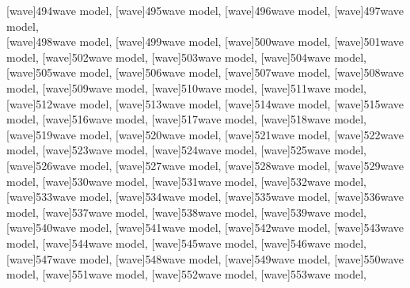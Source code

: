 \documentclass[a4paper,11pt]{article}
\begin{document}
[wave]{494}{wave model},
[wave]{495}{wave model},
[wave]{496}{wave model},
[wave]{497}{wave model}, \\[0.7em]
[wave]{498}{wave model},
[wave]{499}{wave model},
[wave]{500}{wave model},
[wave]{501}{wave model},
[wave]{502}{wave model},
[wave]{503}{wave model},
[wave]{504}{wave model}, \\[0.7em]
[wave]{505}{wave model},
[wave]{506}{wave model},
[wave]{507}{wave model},
[wave]{508}{wave model},
[wave]{509}{wave model},
[wave]{510}{wave model},
[wave]{511}{wave model}, \\[0.7em]
[wave]{512}{wave model},
[wave]{513}{wave model},
[wave]{514}{wave model},
[wave]{515}{wave model},
[wave]{516}{wave model},
[wave]{517}{wave model},
[wave]{518}{wave model}, \\[0.7em]
[wave]{519}{wave model},
[wave]{520}{wave model},
[wave]{521}{wave model},
[wave]{522}{wave model},
[wave]{523}{wave model},
[wave]{524}{wave model},
[wave]{525}{wave model}, \\[0.7em]
[wave]{526}{wave model},
[wave]{527}{wave model},
[wave]{528}{wave model},
[wave]{529}{wave model},
[wave]{530}{wave model},
[wave]{531}{wave model},
[wave]{532}{wave model}, \\[0.7em]
[wave]{533}{wave model},
[wave]{534}{wave model},
[wave]{535}{wave model},
[wave]{536}{wave model},
[wave]{537}{wave model},
[wave]{538}{wave model},
[wave]{539}{wave model}, \\[0.7em]
[wave]{540}{wave model},
[wave]{541}{wave model},
[wave]{542}{wave model},
[wave]{543}{wave model},
[wave]{544}{wave model},
[wave]{545}{wave model},
[wave]{546}{wave model}, \\[0.7em]
[wave]{547}{wave model},
[wave]{548}{wave model},
[wave]{549}{wave model},
[wave]{550}{wave model},
[wave]{551}{wave model},
[wave]{552}{wave model},
[wave]{553}{wave model},
\end{document}
